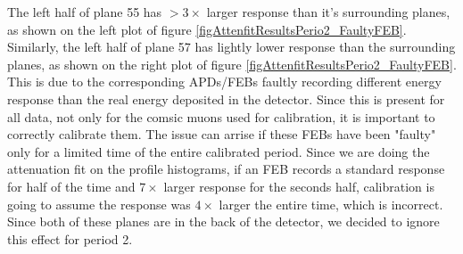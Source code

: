 \documentclass[12pt,a4paper]{article}
\begin{document}
The left half of plane 55 has $>3\times$ larger response than it's surrounding planes, as shown on the left plot of figure \ref{figAttenfitResultsPerio2_FaultyFEB}. Similarly, the left half of plane 57 has lightly lower response than the surrounding planes, as shown on the right plot of figure \ref{figAttenfitResultsPerio2_FaultyFEB}. This is due to the corresponding APDs/FEBs faultly recording different energy response than the real energy deposited in the detector. Since this is present for all data, not only for the comsic muons used for calibration, it is important to correctly calibrate them. The issue can arrise if these FEBs have been "faulty" only for a limited time of the entire calibrated period. Since we are doing the attenuation fit on the profile histograms, if an FEB records a standard response for half of the time and $7\times$ larger response for the seconds half, calibration is going to assume the response was $4\times$ larger the entire time, which is incorrect. Since both of these planes are in the back of the detector, we decided to ignore this effect for period 2.
\end{document}
